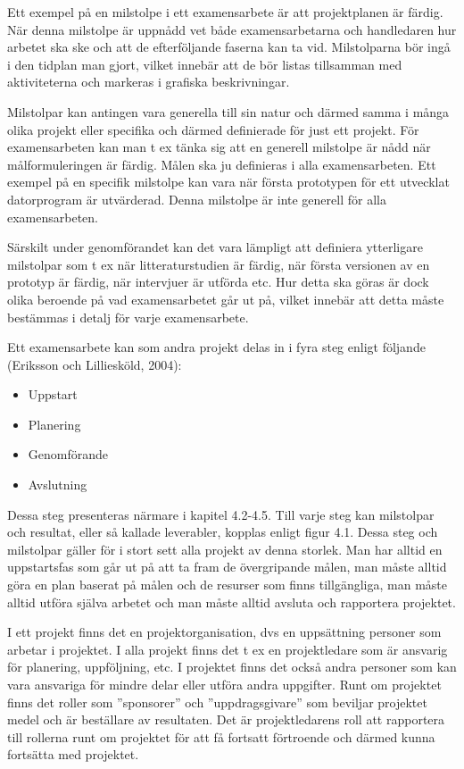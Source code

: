 Ett exempel på en milstolpe i ett examensarbete är att projektplanen är
färdig. När denna milstolpe är uppnådd vet både examensarbetarna och
handledaren hur arbetet ska ske och att de efterföljande faserna kan ta
vid. Milstolparna bör ingå i den tidplan man gjort, vilket innebär att
de bör listas tillsamman med aktiviteterna och markeras i grafiska
beskrivningar.

Milstolpar kan antingen vara generella till sin natur och därmed samma i
många olika projekt eller specifika och därmed definierade för just ett
projekt. För examensarbeten kan man t ex tänka sig att en generell
milstolpe är nådd när målformuleringen är färdig. Målen ska ju
definieras i alla examensarbeten. Ett exempel på en specifik milstolpe
kan vara när första prototypen för ett utvecklat datorprogram är
utvärderad. Denna milstolpe är inte generell för alla examensarbeten.

Särskilt under genomförandet kan det vara lämpligt att definiera
ytterligare milstolpar som t ex när litteraturstudien är färdig, när
första versionen av en prototyp är färdig, när intervjuer är utförda
etc. Hur detta ska göras är dock olika beroende på vad examensarbetet
går ut på, vilket innebär att detta måste bestämmas i detalj för varje
examensarbete.

Ett examensarbete kan som andra projekt delas in i fyra steg enligt
följande (Eriksson och Lilliesköld, 2004):

\begin{itemize}
\item
  Uppstart
\item
  Planering
\item
  Genomförande
\item
  Avslutning
\end{itemize}

Dessa steg presenteras närmare i kapitel 4.2-4.5. Till varje steg kan
milstolpar och resultat, eller så kallade leverabler, kopplas enligt
figur 4.1. Dessa steg och milstolpar gäller för i stort sett alla
projekt av denna storlek. Man har alltid en uppstartsfas som går ut på
att ta fram de övergripande målen, man måste alltid göra en plan baserat
på målen och de resurser som finns tillgängliga, man måste alltid utföra
själva arbetet och man måste alltid avsluta och rapportera projektet.

I ett projekt finns det en projektorganisation, dvs en uppsättning
personer som arbetar i projektet. I alla projekt finns det t ex en
projektledare som är ansvarig för planering, uppföljning, etc. I
projektet finns det också andra personer som kan vara ansvariga för
mindre delar eller utföra andra uppgifter. Runt om projektet finns det
roller som ''sponsorer'' och ''uppdragsgivare'' som beviljar projektet
medel och är beställare av resultaten. Det är projektledarens roll att
rapportera till rollerna runt om projektet för att få fortsatt
förtroende och därmed kunna fortsätta med projektet.

